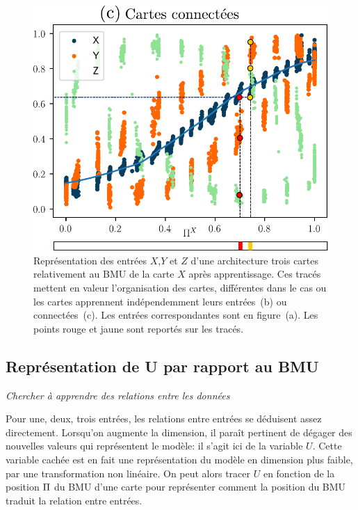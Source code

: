 \begin{figure}
\begin{minipage}{0.3\textwidth}
\end{minipage}
\begin{minipage}{0.34\textwidth}
\includegraphics[width=\textwidth]{maps_test0.pdf}
\end{minipage}
\label{fig:inputs}
\caption{Représentation des entrées $X$,$Y$ et $Z$ d'une architecture trois cartes relativement au BMU de la carte $X$ après apprentissage. Ces tracés mettent en valeur l'organisation des cartes, différentes dans le cas ou les cartes apprennent indépendemment leurs entrées~(b) ou connectées~(c). Les entrées correspondantes sont en figure~(a). Les points rouge et jaune sont reportés sur les tracés.}
\end{figure}

\subsection{Représentation de U par rapport au BMU}
\emph{Chercher à apprendre des relations entre les données}

Pour une, deux, trois entrées, les relations entre entrées se déduisent assez directement. Lorsqu'on augmente la dimension, il paraît pertinent de dégager des nouvelles valeurs qui représentent le modèle: il s'agit ici de la variable $U$. Cette variable cachée est en fait une représentation du modèle en dimension plus faible, par une transformation non linéaire. On peut alors tracer $U$ en fonction de la position $\Pi$ du BMU d'une carte pour représenter comment la position du BMU traduit la relation entre entrées.

